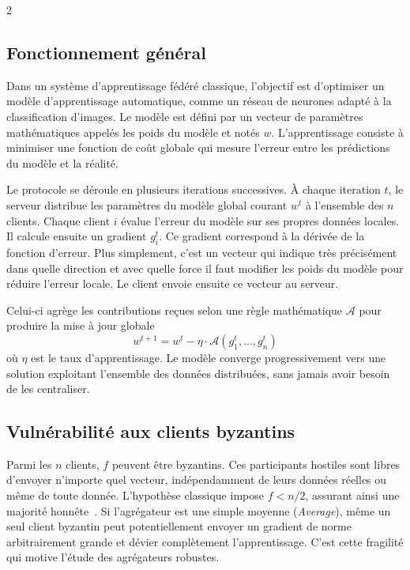 \documentclass{article}
\begin{document}
\begin{multicols}{2}
\subsection{Fonctionnement g\'en\'eral}

Dans un syst\`eme d'apprentissage f\'ed\'er\'e classique, l'objectif est d'optimiser un mod\`ele d'apprentissage automatique, comme un r\'eseau de neurones adapt\'e \`a la classification d'images. Le mod\`ele est d\'efini par un vecteur de param\`etres math\'ematiques appel\'es les poids du mod\`ele et not\'es $w$. L'apprentissage consiste \`a minimiser une fonction de co\^ut globale qui mesure l'erreur entre les pr\'edictions du mod\`ele et la r\'ealit\'e.

Le protocole se d\'eroule en plusieurs iterations successives. \`A chaque iteration $t$, le serveur distribue les param\`etres du mod\`ele global courant $w^t$ \`a l'ensemble des $n$ clients. Chaque client $i$ \'evalue l'erreur du mod\`ele sur ses propres donn\'ees locales. Il calcule ensuite un gradient $g_i^t$. Ce gradient correspond \`a la d\'eriv\'ee de la fonction d'erreur. Plus simplement, c'est un vecteur qui indique tr\`es pr\'ecis\'ement dans quelle direction et avec quelle force il faut modifier les poids du mod\`ele pour r\'eduire l'erreur locale. Le client envoie ensuite ce vecteur au serveur.

Celui-ci agr\`ege les contributions re\c{c}ues selon une r\`egle math\'ematique $\mathcal{A}$ pour produire la mise \`a jour globale
\[
  w^{t+1} = w^t - \eta \cdot \mathcal{A}(g_1^t, \ldots, g_n^t)
\]
o\`u $\eta$ est le taux d'apprentissage. Le mod\`ele converge progressivement vers une solution exploitant l'ensemble des donn\'ees distribu\'ees, sans jamais avoir besoin de les centraliser.

\subsection{Vuln\'erabilit\'e aux clients byzantins}

Parmi les $n$ clients, $f$ peuvent \^etre byzantins. Ces participants hostiles sont libres d'envoyer n'importe quel vecteur, ind\'ependamment de leurs donn\'ees r\'eelles ou m\^eme de toute donn\'ee. L'hypoth\`ese classique impose $f < n/2$, assurant ainsi une majorit\'e honnête~\cite{blanchard2017}. Si l'agr\'egateur est une simple moyenne (\textit{Average}), m\^eme un seul client byzantin peut potentiellement envoyer un gradient de norme arbitrairement grande et d\'evier compl\`etement l'apprentissage. C'est cette fragilit\'e qui motive l'\'etude des agr\'egateurs robustes.


\end{multicols}
\end{document}
